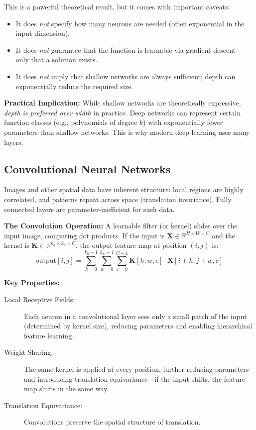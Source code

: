 This is a powerful theoretical result, but it comes with important caveats:

\begin{itemize}
  \item It does \emph{not} specify how many neurons are needed (often exponential in the input dimension).
  \item It does \emph{not} guarantee that the function is learnable via gradient descent---only that a solution exists.
  \item It does \emph{not} imply that shallow networks are always sufficient; depth can exponentially reduce the required size.
\end{itemize}

\begin{intuitionbox}
\textbf{Practical Implication:} While shallow networks are theoretically expressive, \emph{depth is preferred over width} in practice. Deep networks can represent certain function classes (e.g., polynomials of degree $k$) with exponentially fewer parameters than shallow networks. This is why modern deep learning uses many layers.
\end{intuitionbox}


\subsection{Convolutional Neural Networks}

Images and other spatial data have inherent structure: local regions are highly correlated, and patterns repeat across space (translation invariance). Fully connected layers are parameter-inefficient for such data.

\textbf{The Convolution Operation:} A learnable filter (or kernel) slides over the input image, computing dot products. If the input is $\mathbf{X} \in \mathbb{R}^{H \times W \times C}$ and the kernel is $\mathbf{K} \in \mathbb{R}^{k_h \times k_w \times C}$, the output feature map at position $(i, j)$ is:
\[
\text{output}[i, j] = \sum_{h=0}^{k_h-1} \sum_{w=0}^{k_w-1} \sum_{c=0}^{C-1} \mathbf{K}[h, w, c] \cdot \mathbf{X}[i+h, j+w, c]
\]

\textbf{Key Properties:}
\begin{description}
  \item[Local Receptive Fields:] Each neuron in a convolutional layer sees only a small patch of the input (determined by kernel size), reducing parameters and enabling hierarchical feature learning.

  \item[Weight Sharing:] The same kernel is applied at every position, further reducing parameters and introducing translation equivariance---if the input shifts, the feature map shifts in the same way.

  \item[Translation Equivariance:] Convolutions preserve the spatial structure of translation.
\end{description}

